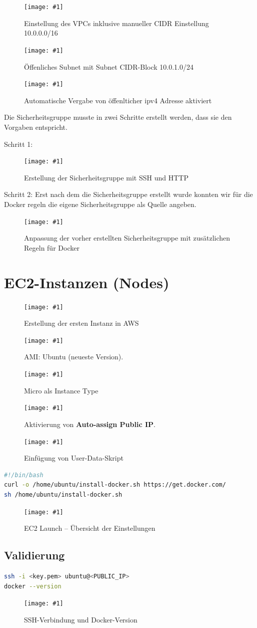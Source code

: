 \documentclass[11pt,a4paper,twocolumn]{article}
\newcommand{\screenshot}[3]{%
  \begin{figure}[H]\centering
    \texttt{[image: \#1]}
    \caption{#2}\label{fig:#3}
  \end{figure}}
\begin{document}
\screenshot{vpc_configuration.png}{Einstellung des VPCs inklusive manueller CIDR Einstellung 10.0.0.0/16}{vpc-overview}

\screenshot{subnetsettings.png}{Öffenliches Subnet mit Subnet CIDR-Block 10.0.1.0/24}{subnet-overview}
\screenshot{auto_public_ipv4.png}{Automatische Vergabe von öffenlticher ipv4 Adresse aktiviert}{auto-public-ipv4}

Die Sicherheitsgruppe musste in zwei Schritte erstellt werden, dass sie den Vorgaben entspricht.

Schritt 1:
\screenshot{create_inbound_rules.png}{Erstellung der Sicherheitsgruppe mit SSH und HTTP}{create inbound rules}
Schritt 2:
Erst nach dem die Sicherheitsgruppe erstellt wurde konnten wir für die Docker regeln die eigene Sicherheitsgruppe als Quelle angeben.
\screenshot{edit_inbound_rules.png}{Anpassung der vorher erstellten Sicherheitsgruppe mit zusätzlichen Regeln für Docker}{edit inbound rules}

\section{EC2-Instanzen (Nodes)}

\screenshot{create_instance.png}{Erstellung der ersten Instanz in AWS}{create instance}
\screenshot{operating_system.png}{AMI: Ubuntu (neueste Version).}{operating system}
\screenshot{instance_type.png}{Micro als Instance Type}{instance type}
\screenshot{networksettings.png}{Aktivierung von \textbf{Auto-assign Public IP}.}{networksettings}
\screenshot{userdata.png}{Einfügung von User-Data-Skript}{userdata}

\begin{lstlisting}[language=bash,caption={EC2 User Data – Docker Installation}]
#!/bin/bash
curl -o /home/ubuntu/install-docker.sh https://get.docker.com/
sh /home/ubuntu/install-docker.sh
\end{lstlisting}

\screenshot{instance_summary.png}{EC2 Launch – Übersicht der Einstellungen}{ec2-launch}

\subsection{Validierung}
\begin{lstlisting}[language=bash]
ssh -i <key.pem> ubuntu@<PUBLIC_IP>
docker --version
\end{lstlisting}
\screenshot{ssh_connection.png}{SSH-Verbindung und Docker-Version}{ssh-docker}
\end{document}

